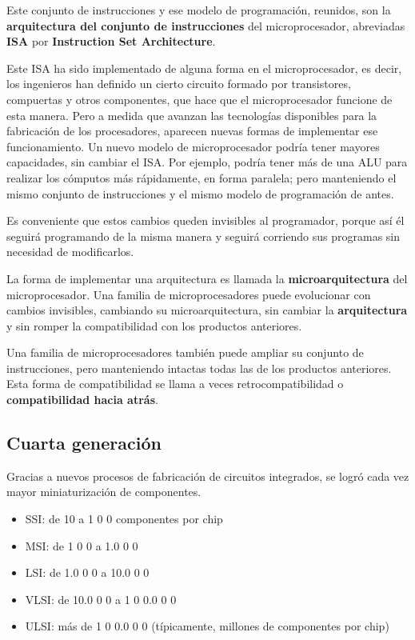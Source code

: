 \documentclass[spanish,A4,]{article}
\begin{document}
Este conjunto de instrucciones y ese modelo de programación, reunidos,
son la \textbf{arquitectura del conjunto de instrucciones} del
microprocesador, abreviadas \textbf{ISA} por \textbf{Instruction Set
Architecture}.

Este ISA ha sido implementado de alguna forma en el microprocesador, es
decir, los ingenieros han definido un cierto circuito formado por
transistores, compuertas y otros componentes, que hace que el
microprocesador funcione de esta manera. Pero a medida que avanzan las
tecnologías disponibles para la fabricación de los procesadores,
aparecen nuevas formas de implementar ese funcionamiento. Un nuevo
modelo de microprocesador podría tener mayores capacidades, sin cambiar
el ISA. Por ejemplo, podría tener más de una ALU para realizar los
cómputos más rápidamente, en forma paralela; pero manteniendo el mismo
conjunto de instrucciones y el mismo modelo de programación de antes.

Es conveniente que estos cambios queden invisibles al programador,
porque así él seguirá programando de la misma manera y seguirá corriendo
sus programas sin necesidad de modificarlos.

La forma de implementar una arquitectura es llamada la
\textbf{microarquitectura} del microprocesador. Una familia de
microprocesadores puede evolucionar con cambios invisibles, cambiando su
microarquitectura, sin cambiar la \textbf{arquitectura} y sin romper la
compatibilidad con los productos anteriores.

Una familia de microprocesadores también puede ampliar su conjunto de
instrucciones, pero manteniendo intactas todas las de los productos
anteriores. Esta forma de compatibilidad se llama a veces
retrocompatibilidad o \textbf{compatibilidad hacia atrás}.

\subsection{Cuarta generación}\label{cuarta-generaciuxf3n}

Gracias a nuevos procesos de fabricación de circuitos integrados, se
logró cada vez mayor miniaturización de componentes.

\begin{itemize}
\itemsep1pt\parskip0pt
\item
  SSI: de 10 a 1 0 0 componentes por chip
\item
  MSI: de 1 0 0 a 1.0 0 0
\item
  LSI: de 1.0 0 0 a 10.0 0 0
\item
  VLSI: de 10.0 0 0 a 1 0 0.0 0 0
\item
  ULSI: más de 1 0 0.0 0 0 (típicamente, millones de componentes por chip)
\end{itemize}
\end{document}
